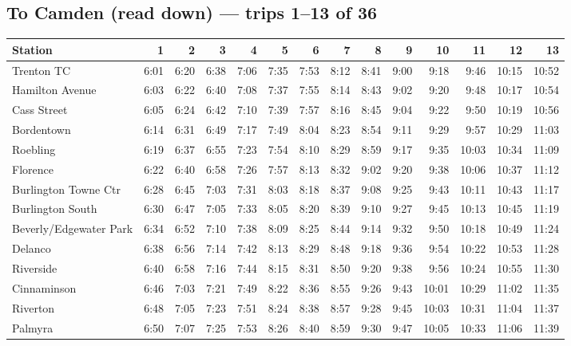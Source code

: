 \subsection*{To Camden (read down) --- trips 1--13 of 36}
\begin{center}\footnotesize\setlength{\tabcolsep}{3pt}\begin{tabular}{@{}lrrrrrrrrrrrrr@{}}\toprule
Station & 1 & 2 & 3 & 4 & 5 & 6 & 7 & 8 & 9 & 10 & 11 & 12 & 13 \\\midrule
Trenton TC & 6:01 & 6:20 & 6:38 & 7:06 & 7:35 & 7:53 & 8:12 & 8:41 & 9:00 & 9:18 & 9:46 & 10:15 & 10:52 \\
Hamilton Avenue & 6:03 & 6:22 & 6:40 & 7:08 & 7:37 & 7:55 & 8:14 & 8:43 & 9:02 & 9:20 & 9:48 & 10:17 & 10:54 \\
Cass Street & 6:05 & 6:24 & 6:42 & 7:10 & 7:39 & 7:57 & 8:16 & 8:45 & 9:04 & 9:22 & 9:50 & 10:19 & 10:56 \\
Bordentown & 6:14 & 6:31 & 6:49 & 7:17 & 7:49 & 8:04 & 8:23 & 8:54 & 9:11 & 9:29 & 9:57 & 10:29 & 11:03 \\
Roebling & 6:19 & 6:37 & 6:55 & 7:23 & 7:54 & 8:10 & 8:29 & 8:59 & 9:17 & 9:35 & 10:03 & 10:34 & 11:09 \\
Florence & 6:22 & 6:40 & 6:58 & 7:26 & 7:57 & 8:13 & 8:32 & 9:02 & 9:20 & 9:38 & 10:06 & 10:37 & 11:12 \\
Burlington Towne Ctr & 6:28 & 6:45 & 7:03 & 7:31 & 8:03 & 8:18 & 8:37 & 9:08 & 9:25 & 9:43 & 10:11 & 10:43 & 11:17 \\
Burlington South & 6:30 & 6:47 & 7:05 & 7:33 & 8:05 & 8:20 & 8:39 & 9:10 & 9:27 & 9:45 & 10:13 & 10:45 & 11:19 \\
Beverly/Edgewater Park & 6:34 & 6:52 & 7:10 & 7:38 & 8:09 & 8:25 & 8:44 & 9:14 & 9:32 & 9:50 & 10:18 & 10:49 & 11:24 \\
Delanco & 6:38 & 6:56 & 7:14 & 7:42 & 8:13 & 8:29 & 8:48 & 9:18 & 9:36 & 9:54 & 10:22 & 10:53 & 11:28 \\
Riverside & 6:40 & 6:58 & 7:16 & 7:44 & 8:15 & 8:31 & 8:50 & 9:20 & 9:38 & 9:56 & 10:24 & 10:55 & 11:30 \\
Cinnaminson & 6:46 & 7:03 & 7:21 & 7:49 & 8:22 & 8:36 & 8:55 & 9:26 & 9:43 & 10:01 & 10:29 & 11:02 & 11:35 \\
Riverton & 6:48 & 7:05 & 7:23 & 7:51 & 8:24 & 8:38 & 8:57 & 9:28 & 9:45 & 10:03 & 10:31 & 11:04 & 11:37 \\
Palmyra & 6:50 & 7:07 & 7:25 & 7:53 & 8:26 & 8:40 & 8:59 & 9:30 & 9:47 & 10:05 & 10:33 & 11:06 & 11:39 \\

\end{tabular}
\end{center}
